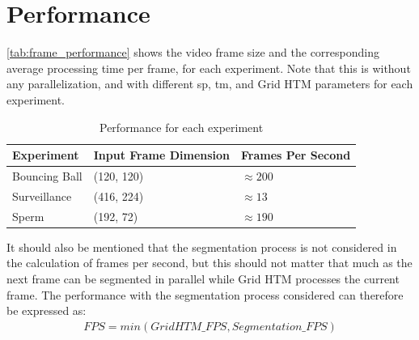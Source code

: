 \section{Performance}
\autoref{tab:frame_performance} shows the video frame size and the corresponding average processing time per frame, for each experiment. Note that this is without any parallelization, and with different \gls*{sp}, \gls*{tm}, and Grid HTM parameters for each experiment.
\begin{table}[H]
    \centering
    \begin{tabularx}{\linewidth}{@{}XlX@{}}
        \toprule
        \textbf{Experiment} & \textbf{Input Frame Dimension} & \textbf{Frames Per Second} \\
        \midrule
        Bouncing Ball       & (120, 120)                     & $\approx 200$              \\
        Surveillance        & (416, 224)                     & $\approx 13$               \\
        Sperm               & (192, 72)                      & $\approx 190$              \\
        \bottomrule
    \end{tabularx}
    \caption{Performance for each experiment}
    \label{tab:frame_performance}
\end{table}
It should also be mentioned that the segmentation process is not considered in the calculation of frames per second, but this should not matter that much as the next frame can be segmented in parallel while Grid HTM processes the current frame. The performance with the segmentation process considered can therefore be expressed as:
\begin{align*}
    FPS=min(GridHTM\_FPS, Segmentation\_FPS)
\end{align*}
